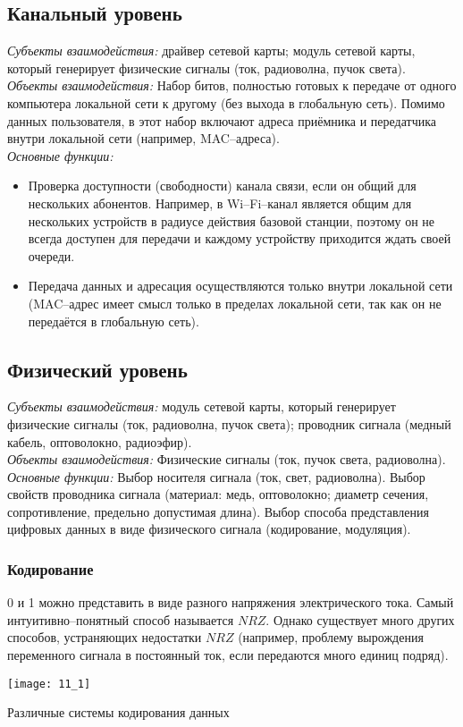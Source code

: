\subsection{Канальный уровень}
\emph{Субъекты взаимодействия:} драйвер сетевой карты; модуль сетевой карты, который генерирует физические сигналы (ток, радиоволна, пучок света).
\\\emph{Объекты взаимодействия:} Набор битов, полностью готовых к передаче от одного компьютера локальной сети к другому (без выхода в глобальную сеть). Помимо данных пользователя, в этот набор включают адреса приёмника и передатчика внутри локальной сети (например, MAC--адреса).
\\\emph{Основные функции:}
\begin{itemize}
  \item Проверка доступности (свободности) канала связи, если он общий для нескольких абонентов. Например, в Wi--Fi--канал является общим для нескольких устройств в радиусе действия базовой станции, поэтому он не всегда доступен для передачи и каждому устройству приходится ждать своей очереди.
  \item Передача данных и адресация осуществляются только внутри локальной сети (MAC--адрес имеет смысл только в пределах локальной сети, так как он не передаётся в глобальную сеть).
\end{itemize}
\subsection{Физический уровень}
\emph{Субъекты взаимодействия:} модуль сетевой карты, который генерирует физические сигналы (ток, радиоволна, пучок света); проводник сигнала (медный кабель, оптоволокно, радиоэфир).
\\\emph{Объекты взаимодействия:} Физические сигналы (ток, пучок света, радиоволна).
\\\emph{Основные функции:} Выбор носителя сигнала (ток, свет, радиоволна). Выбор свойств проводника сигнала (материал: медь,
оптоволокно; диаметр сечения, сопротивление, предельно допустимая длина). Выбор способа представления цифровых данных в виде физического сигнала (кодирование, модуляция).
\subsubsection{Кодирование}
0 и 1 можно представить в виде разного напряжения электрического тока. Самый интуитивно--понятный способ называется $NRZ$. Однако существует много других способов, устраняющих недостатки $NRZ$ (например, проблему вырождения переменного сигнала в постоянный ток, если передаются много единиц подряд).
\\
\begin{minipage}{\textwidth}
\texttt{[image: 11\_1]}
\begin{center}
Различные системы кодирования данных
\end{center}
\end{minipage}
\\
